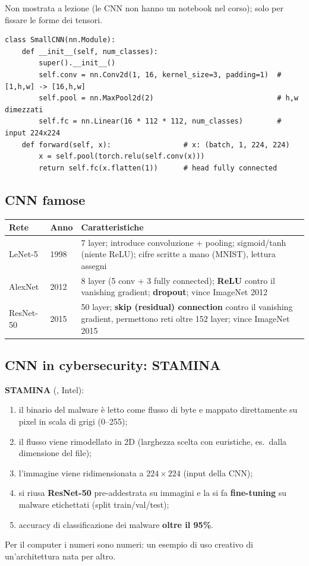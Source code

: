 \begin{integrazione}
Non mostrata a lezione (le CNN non hanno un notebook nel corso); solo per fissare le forme dei tensori.
\begin{lstlisting}
class SmallCNN(nn.Module):
    def __init__(self, num_classes):
        super().__init__()
        self.conv = nn.Conv2d(1, 16, kernel_size=3, padding=1)  # [1,h,w] -> [16,h,w]
        self.pool = nn.MaxPool2d(2)                             # h,w dimezzati
        self.fc = nn.Linear(16 * 112 * 112, num_classes)        # input 224x224
    def forward(self, x):                 # x: (batch, 1, 224, 224)
        x = self.pool(torch.relu(self.conv(x)))
        return self.fc(x.flatten(1))      # head fully connected
\end{lstlisting}
\end{integrazione}

\subsection{CNN famose}
\begin{center}
\small
\begin{tabularx}{\textwidth}{l l X}
\toprule
\textbf{Rete} & \textbf{Anno} & \textbf{Caratteristiche}\\
\midrule
LeNet-5 & 1998 & 7 layer; introduce convoluzione + pooling; sigmoid/tanh (niente ReLU); cifre scritte a mano (MNIST), lettura assegni\\
AlexNet & 2012 & 8 layer (5 conv + 3 fully connected); \textbf{ReLU} contro il vanishing gradient; \textbf{dropout}; vince ImageNet 2012\\
ResNet-50 & 2015 & 50 layer; \textbf{skip (residual) connection} contro il vanishing gradient, permettono reti oltre 152 layer; vince ImageNet 2015\\
\bottomrule
\end{tabularx}
\end{center}

\subsection{CNN in cybersecurity: STAMINA}
\textbf{STAMINA} (, Intel):
\begin{enumerate}
  \item il binario del malware è letto come flusso di byte e mappato direttamente su pixel in scala di grigi (0--255);
  \item il flusso viene rimodellato in 2D (larghezza scelta con euristiche, es.\ dalla dimensione del file);
  \item l'immagine viene ridimensionata a $224\times224$ (input della CNN);
  \item si riusa \textbf{ResNet-50} pre-addestrata su immagini e la si fa \textbf{fine-tuning} su malware etichettati (split train/val/test);
  \item accuracy di classificazione dei malware \textbf{oltre il 95\%}.
\end{enumerate}
Per il computer i numeri sono numeri: un esempio di uso creativo di un'architettura nata per altro.

